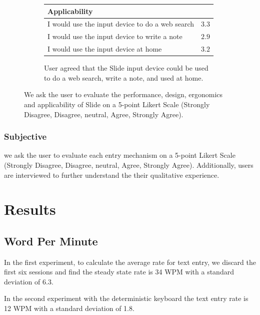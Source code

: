 \begin{figure}
\vspace{4mm} 


\begin{subfigure}{1\columnwidth}
  \begin{tabular}{@{}p{7cm}p{1cm}@{}}\toprule
  \textbf{Applicability}                  &           \\
  \midrule
  I would use the input device to do a web search &     $3.3$     \\
  I would use the input device to write a note    &     $2.9$     \\
  I would use the input device at home        &     $3.2$     \\
  \bottomrule
  \end{tabular}
  \caption{User agreed that the Slide input device could be used to do a web search, write a note, and used at home. }
  \label{fig:controllerVive}
\end{subfigure}

  \caption{We ask the user to evaluate the performance, design, ergonomics and applicability of Slide on a 5-point Likert Scale (Strongly Disagree, Disagree, neutral, Agree, Strongly Agree).}
  
  \label{table:usability}

\end{figure}


\subsubsection{Subjective }
we ask the user to evaluate each entry mechanism on a 5-point Likert Scale (Strongly Disagree, Disagree, neutral, Agree, Strongly Agree).
Additionally, users are  interviewed to further understand the their qualitative experience.


\section{Results}
\subsection{Word Per Minute}
In the first experiment, to calculate the average rate for text entry, we discard the first six sessions and find the steady state rate is 34 WPM with a standard deviation of 6.3.

In the second experiment with the deterministic keyboard the text entry rate is 12 WPM with a standard deviation of 1.8.

